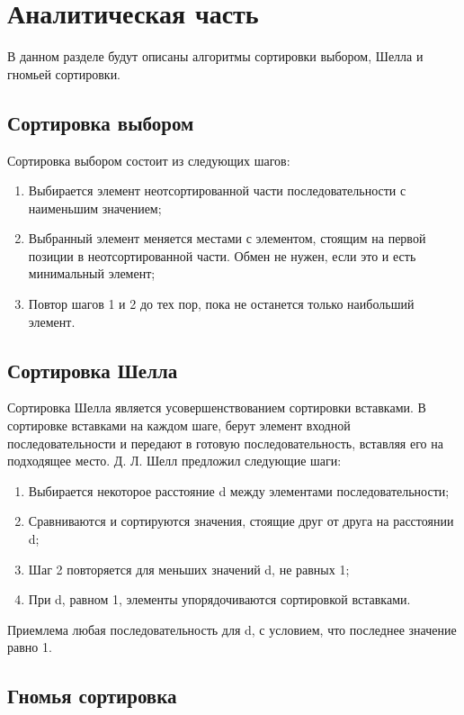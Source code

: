 \chapter{Аналитическая часть}

В данном разделе будут описаны алгоритмы сортировки выбором, Шелла и гномьей сортировки.

\section{Сортировка выбором}

Сортировка выбором\cite{virt} состоит из следующих шагов:

\begin{enumerate}
	\item Выбирается элемент неотсортированной части последовательности с наименьшим значением;
	\item Выбранный элемент меняется местами с элементом, стоящим на первой позиции в неотсортированной части. Обмен не нужен, если это и есть минимальный элемент;
	\item Повтор шагов 1 и 2 до тех пор, пока не останется только наибольший элемент.
\end{enumerate}

\section{Сортировка Шелла}

Сортировка Шелла\cite{virt} является усовершенствованием сортировки вставками. В сортировке вставками на каждом шаге, берут элемент входной последовательности и передают в готовую последовательность, вставляя его на подходящее место. Д. Л. Шелл предложил следующие шаги:

\begin{enumerate}
	\item Выбирается некоторое расстояние d между элементами последовательности;
	\item Сравниваются и сортируются значения, стоящие друг от друга на расстоянии d;
	\item Шаг 2 повторяется для меньших значений d, не равных 1;
	\item При d, равном 1, элементы упорядочиваются сортировкой вставками.
\end{enumerate}

Приемлема любая последовательность для d, с условием, что последнее значение равно 1.

\section{Гномья сортировка}

